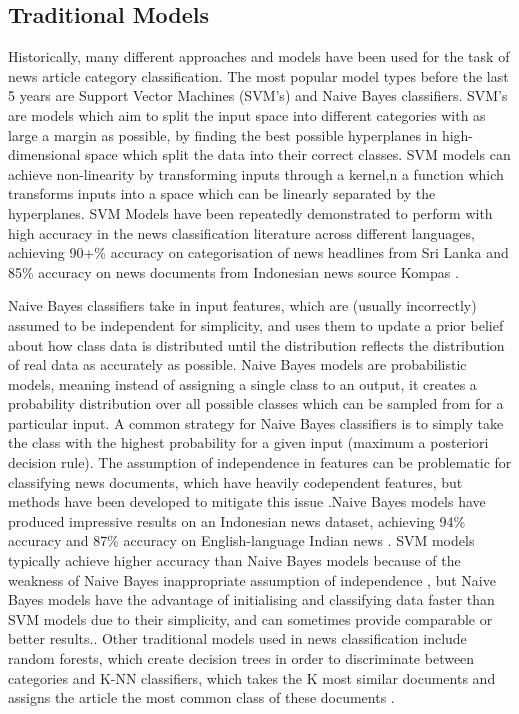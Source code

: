 \documentclass{l4proj}
\begin{document}
\subsection{Traditional Models}
Historically, many different approaches and models have been used for the task of news article category classification. The most popular model types before the last 5 years are Support Vector Machines (SVM's) and Naive Bayes classifiers. SVM's are models which aim to split the input space into different categories with as large a margin as possible, by finding the best possible hyperplanes in high-dimensional space which split the data into their correct classes. SVM models can achieve non-linearity by transforming inputs through a kernel,n a function which transforms inputs into a space which can be linearly separated by the hyperplanes. SVM Models have been repeatedly demonstrated to perform with high accuracy in the news classification literature across different languages, achieving 90+\% accuracy on categorisation of news headlines from Sri Lanka \citep{dilrukshi2013twitter} and 85\% accuracy on news documents from Indonesian news source Kompas \citep{liliana2011indonesian}. \par
Naive Bayes classifiers take in input features, which are (usually incorrectly) assumed to be independent for simplicity, and uses them to update a prior belief about how class data is distributed until the distribution reflects the distribution of real data as accurately as possible. Naive Bayes models are probabilistic models, meaning instead of assigning a single class to an output, it creates a probability distribution over all possible classes which can be sampled from for a particular input. A common strategy for Naive Bayes classifiers is to simply take the class with the highest probability for a given input (maximum a posteriori decision rule). The assumption of independence in features can be problematic for classifying news documents, which have heavily codependent features, but methods have been developed to mitigate this issue \citep{qiang2010effective}.Naive Bayes models have produced impressive results on an Indonesian news dataset, achieving 94\% accuracy \citep{septian2017indonesian} and 87\% accuracy on English-language Indian news \citep{kumar2022intelligent}.
SVM models typically achieve higher accuracy than Naive Bayes models because of the weakness of Naive Bayes inappropriate assumption of independence \citep{dilrukshi2013twitter2, shahi2018nepali, fanny2018comparison}, but Naive Bayes models have the advantage of initialising and classifying data faster than SVM models due to their simplicity, and can sometimes provide comparable or better results.\citep{ting2011naive}. Other traditional models used in news classification include random forests, which create decision trees in order to discriminate between categories \citep{liparas2014news} and K-NN classifiers, which takes the K most similar documents and assigns the article the most common class of these documents \citep{chen2020lao}.
\end{document}
